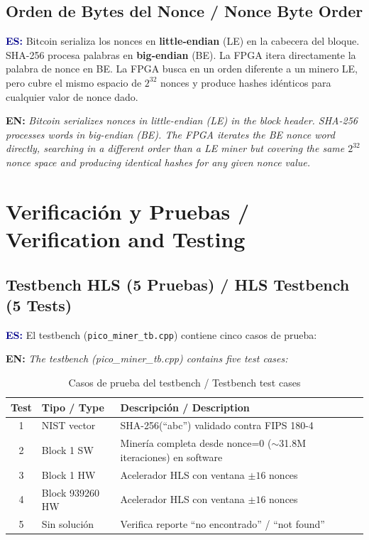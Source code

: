\documentclass[12pt,a4paper]{article}
\newcommand{\es}[1]{\foreignlanguage{spanish}{#1}}
\newcommand{\en}[1]{\foreignlanguage{english}{#1}}
\newcommand{\bsection}[2]{%
    \section{#1 \textnormal{\normalsize\color{accentblue}/ #2}}%
}
\newcommand{\bsubsection}[2]{%
    \subsection{#1 \textnormal{\small\color{accentblue}/ #2}}%
}
\newenvironment{bilingual}{%
    \par\medskip
}{%
    \par\medskip
}
\newcommand{\espara}[1]{\noindent\textcolor{darkblue}{\textbf{ES:}} #1\par\smallskip}
\newcommand{\enpara}[1]{\noindent\textcolor{accentblue}{\textbf{EN:}} \textit{#1}\par\smallskip}
\begin{document}
\bsubsection{Orden de Bytes del Nonce}{Nonce Byte Order}

\begin{bilingual}
\espara{%
Bitcoin serializa los nonces en \textbf{little-endian} (LE) en la cabecera del bloque.
SHA-256 procesa palabras en \textbf{big-endian} (BE). La FPGA itera directamente la
palabra de nonce en BE. La FPGA busca en un orden diferente a un minero LE, pero
cubre el mismo espacio de $2^{32}$ nonces y produce hashes id\'enticos para cualquier
valor de nonce dado.}

\enpara{%
Bitcoin serializes nonces in little-endian (LE) in the block header. SHA-256
processes words in big-endian (BE). The FPGA iterates the BE nonce word directly,
searching in a different order than a LE miner but covering the same $2^{32}$
nonce space and producing identical hashes for any given nonce value.}
\end{bilingual}

\bsection{Verificaci\'on y Pruebas}{Verification and Testing}

\bsubsection{Testbench HLS (5 Pruebas)}{HLS Testbench (5 Tests)}

\begin{bilingual}
\espara{%
El testbench (\texttt{pico\_miner\_tb.cpp}) contiene cinco casos de prueba:}

\enpara{%
The testbench (pico\_miner\_tb.cpp) contains five test cases:}
\end{bilingual}

\begin{table}[h]
    \centering
    \caption{\es{Casos de prueba del testbench} / \en{Testbench test cases}}
    \begin{tabular}{@{}clp{7cm}@{}}
        \toprule
        \textbf{Test} & \textbf{\es{Tipo} / \en{Type}} & \textbf{\es{Descripci\'on} / \en{Description}} \\
        \midrule
        1 & NIST vector & SHA-256(``abc'') validado contra FIPS 180-4 \\
        2 & Block 1 SW  & Miner\'ia completa desde nonce=0 ($\sim$31.8M iteraciones) en software \\
        3 & Block 1 HW  & Acelerador HLS con ventana $\pm16$ nonces \\
        4 & Block 939260 HW & Acelerador HLS con ventana $\pm16$ nonces \\
        5 & Sin soluci\'on & Verifica reporte ``no encontrado'' / ``not found'' \\
        \bottomrule
    \end{tabular}
\end{table}
\end{document}
